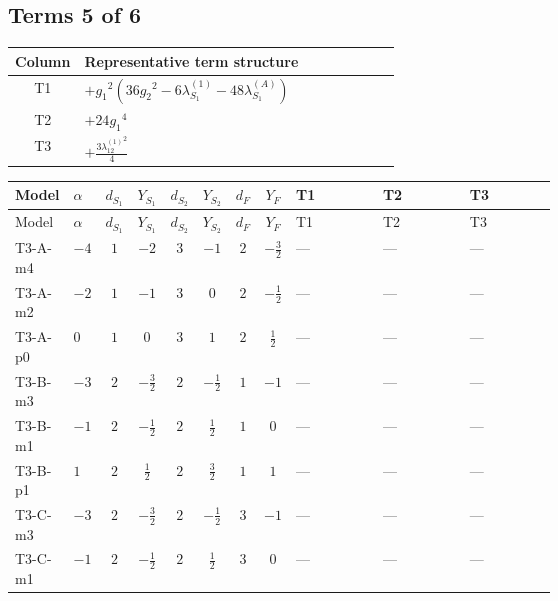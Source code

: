 \documentclass[8pt]{article}
\begin{document}
\begin{landscape}
\subsection*{Terms 5 of 6}
\begin{center}
\begin{tabular}{@{}c >{\raggedright\arraybackslash}p{0.82\linewidth}@{}}
\toprule
Column & Representative term structure \\
\midrule
T1 & \(\displaystyle +{g_1}^2 \left(36 {g_2}^2-6 {\lambda_{S_1}^{(1)}}-48 {\lambda_{S_1}^{(A)}}\right)\) \\
\midrule
T2 & \(\displaystyle +24 {g_1}^4\) \\
\midrule
T3 & \(\displaystyle +\frac{3 {\lambda_{12}^{(1)}}^2}{4}\) \\
\midrule
\bottomrule
\end{tabular}
\end{center}
\smallskip
\tiny
\begin{longtable}{@{}llcccccc >{\raggedright\arraybackslash}p{0.21\linewidth} >{\raggedright\arraybackslash}p{0.21\linewidth} >{\raggedright\arraybackslash}p{0.21\linewidth}@{}}
\toprule
Model & $\alpha$ & $d_{S_1}$ & $Y_{S_1}$ & $d_{S_2}$ & $Y_{S_2}$ & $d_F$ & $Y_F$ & T1 & T2 & T3 \\
\midrule
\endfirsthead
\toprule
Model & $\alpha$ & $d_{S_1}$ & $Y_{S_1}$ & $d_{S_2}$ & $Y_{S_2}$ & $d_F$ & $Y_F$ & T1 & T2 & T3 \\
\midrule
\endhead
T3-A-m4 & $-4$ & $1$ & $-2$ & $3$ & $-1$ & $2$ & $-\frac{3}{2}$ & --- & --- & --- \\
\midrule
T3-A-m2 & $-2$ & $1$ & $-1$ & $3$ & $0$ & $2$ & $-\frac{1}{2}$ & --- & --- & --- \\
\midrule
T3-A-p0 & $0$ & $1$ & $0$ & $3$ & $1$ & $2$ & $\frac{1}{2}$ & --- & --- & --- \\
\midrule
T3-B-m3 & $-3$ & $2$ & $-\frac{3}{2}$ & $2$ & $-\frac{1}{2}$ & $1$ & $-1$ & --- & --- & --- \\
\midrule
T3-B-m1 & $-1$ & $2$ & $-\frac{1}{2}$ & $2$ & $\frac{1}{2}$ & $1$ & $0$ & --- & --- & --- \\
\midrule
T3-B-p1 & $1$ & $2$ & $\frac{1}{2}$ & $2$ & $\frac{3}{2}$ & $1$ & $1$ & --- & --- & --- \\
\midrule
T3-C-m3 & $-3$ & $2$ & $-\frac{3}{2}$ & $2$ & $-\frac{1}{2}$ & $3$ & $-1$ & --- & --- & --- \\
\midrule
T3-C-m1 & $-1$ & $2$ & $-\frac{1}{2}$ & $2$ & $\frac{1}{2}$ & $3$ & $0$ & --- & --- & --- \\

\end{longtable}
\end{landscape}
\end{document}
